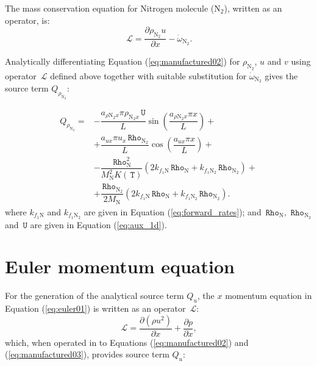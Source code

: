 \documentclass[10pt]{article}
\newcommand{\Diff}[2] {\dfrac{\partial( #1)}{\partial #2}}
\newcommand{\diff}[2] {\dfrac{\partial #1 }{\partial #2}}
\newcommand{\Lo}{\,\mathcal{L}}
\newcommand{\Rho}{\,\mathtt{Rho}}
\newcommand{\T}{\,\mathtt{T}}
\newcommand{\U}{\,\mathtt{U}}
\begin{document}
The mass conservation equation for Nitrogen molecule ($\text{N}_2$), written as an operator, is:
\begin{equation*}
 \label{eq:euler1d_11a}
\Lo =  \diff{\rho_{\text{N}_2} u }{x} - \dot{\omega}_{\text{N}_2}.
\end{equation*}

Analytically differentiating Equation (\ref{eq:manufactured02}) for $\rho_{\text{N}_2}$, $u$ and $v$ using operator $\Lo$ defined above together with suitable substitution for $\dot{\omega}_{\text{N}_2}$ gives the source term $Q_{\rho_{\text{N}_2}}$:

\begin{equation}
\begin{split}
Q_{\rho_{\text{N}_2}}=&-\dfrac{a_{ \rho \text{N}_2 x} \pi \rho_{\text{N}_2 x} \U }{L}\sin\left(\dfrac{a_{ \rho \text{N}_2 x} \pi x}{L}\right)+\\
&+\dfrac{a_{ux} \pi u_x \Rho_{\text{N}_2} }{L}\cos\left(\dfrac{a_{ux} \pi x}{L}\right)+\\
&-\dfrac{\Rho_\text{N}^2}{M_{\text{N}}^2 K(\T)} \left(2 k_{f_1 \text{N}} \Rho_\text{N}+k_{f_1 \text{N}_2} \Rho_{\text{N}_2}\right) +\\
&+\dfrac{\Rho_{\text{N}_2}}{2M_{\text{N}}}\left(2 k_{f_1 \text{N}} \Rho_\text{N}+k_{f_1 \text{N}_2} \Rho_{\text{N}_2}\right) .
\end{split}
\end{equation}
where  $k_{f_1 \text{N}}$ and $k_{f_1 \text{N}_2}$ are given in Equation (\ref{eq:forward_rates}); and $\Rho_{\text{N}},\,\Rho_{\text{N}_2}$ and $\U$ are given in Equation (\ref{eq:aux_1d}).


\section{Euler momentum equation}

For the generation of the analytical source term $Q_u$, the $x$ momentum equation in Equation (\ref{eq:euler01}) is written as an operator $\Lo$:
\begin{equation*}
 \label{eq:euler1d_12}
\Lo =\Diff{\rho u^2}{x}+\diff{p}{x},
\end{equation*}
which, when operated in to Equations (\ref{eq:manufactured02}) and (\ref{eq:manufactured03}), provides source term $Q_{u}$:
\end{document}
